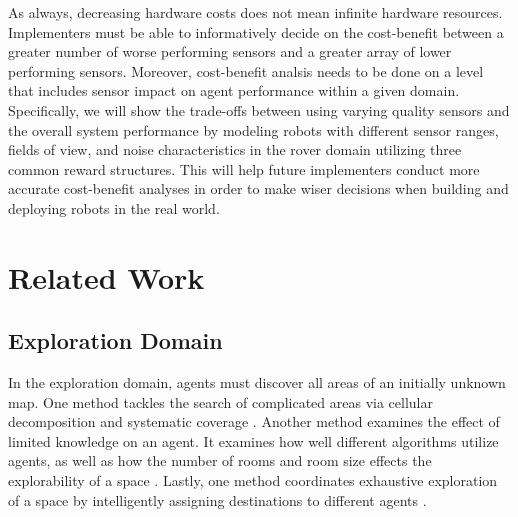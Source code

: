 \documentclass[letterpaper, 10 pt, conference]{ieeeconf}  %
\begin{document}
As always, decreasing hardware costs does not mean infinite hardware resources.
Implementers must be able to informatively decide on the cost-benefit 
between a greater number of worse performing sensors and a greater array of lower performing sensors. Moreover, cost-benefit analsis needs to be done on a level that includes sensor impact on  agent performance within a given domain. Specifically, we will show the trade-offs between using varying quality sensors and the overall system performance by modeling robots with different sensor ranges, fields of view, and noise characteristics in the rover domain utilizing three common reward structures. This will help future implementers conduct more accurate cost-benefit analyses in order to make wiser decisions when building and deploying robots in the real world.


\section{Related Work}
\subsection{Exploration Domain}
In the exploration domain, agents must discover all areas of an
initially unknown map. One method tackles the search of complicated
areas via cellular decomposition and systematic coverage \cite{choset2001coverage}. Another
method examines the effect of limited knowledge on an agent. It
examines how well different algorithms utilize agents, as well as how
the number of rooms and room size effects the explorability of a space
\cite{ferranti2007brick}. Lastly, one method coordinates exhaustive exploration of a space
by intelligently assigning destinations to different agents \cite{burgard2005coordinated}.
\end{document}
